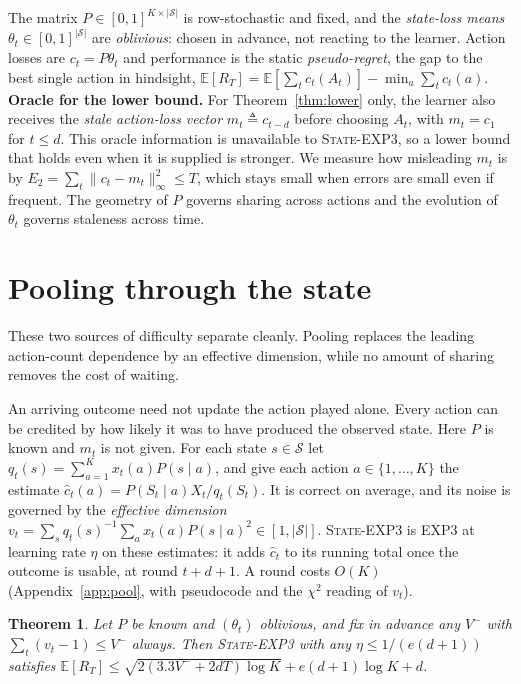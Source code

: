 \documentclass{article}
\newtheorem{theorem}{Theorem}
\theoremstyle{remark}
\newcommand{\Ex}{\mathbb{E}}
\newcommand{\etwo}{E_2}
\newcommand{\Sset}{\mathcal{S}}
\begin{document}
The matrix $P\in[0,1]^{K\times|\Sset|}$ is row-stochastic and fixed, and the \emph{state-loss means} $\theta_t\in[0,1]^{|\Sset|}$ are \emph{oblivious}:
chosen in advance, not reacting to the learner. Action losses are $c_t=P\theta_t$ and performance
is the static \emph{pseudo-regret}, the gap to the best single action in hindsight,
$\Ex[R_T]=\Ex[\sum_tc_t(A_t)]-\min_a\sum_tc_t(a)$. \textbf{Oracle for the lower bound.} For Theorem~\ref{thm:lower} only, the learner also receives the \emph{stale action-loss vector} $m_t\triangleq c_{t-d}$ before choosing $A_t$, with $m_t=c_1$ for $t\le d$. This oracle information is unavailable to
\textsc{State-EXP3}, so a lower bound that holds even when it is supplied is stronger. We measure how misleading $m_t$ is by $\etwo=\sum_t\|c_t-m_t\|_\infty^2\le T$, which stays small when
errors are small even if frequent. The geometry of $P$ governs sharing across actions and the
evolution of $\theta_t$ governs staleness across time.

\section{Pooling through the state}\label{sec:alg}

These two sources of difficulty separate cleanly. Pooling replaces the leading action-count
dependence by an effective dimension, while no amount of sharing removes the cost of waiting.

An arriving outcome need not update the action played alone. Every action can be credited by how
likely it was to have produced the observed state. Here $P$ is known and $m_t$ is not given. For each state
$s\in\Sset$ let $q_t(s)=\sum_{a=1}^Kx_t(a)P(s\mid a)$, and give each action $a\in\{1,\dots,K\}$ the
estimate $\hat c_t(a)=P(S_t\mid a)X_t/q_t(S_t)$. It is correct on average, and its noise is governed by the
\emph{effective dimension}
$v_t=\sum_sq_t(s)^{-1}\sum_ax_t(a)P(s\mid a)^2\in[1,|\Sset|]$.
\textsc{State-EXP3} is \textsc{EXP3} \citep{auer2002} at learning rate $\eta$ on these estimates: it
adds $\hat c_t$ to its running total once the outcome is usable, at round $t+d+1$. A round costs
$O(K)$ (Appendix~\ref{app:pool}, with pseudocode and the $\chi^2$ reading of $v_t$).

\begin{theorem}\label{thm:m1}
Let $P$ be known and $(\theta_t)$ oblivious, and fix in advance any $V^-$ with
$\sum_t(v_t-1)\le V^-$ always.
Then \textup{\textsc{State-EXP3}} with any $\eta\le1/(e(d+1))$ satisfies
$\Ex[R_T]\le\sqrt{2(3.3V^-+2dT)\log K}+e(d+1)\log K+d$.
\end{theorem}
\end{document}
